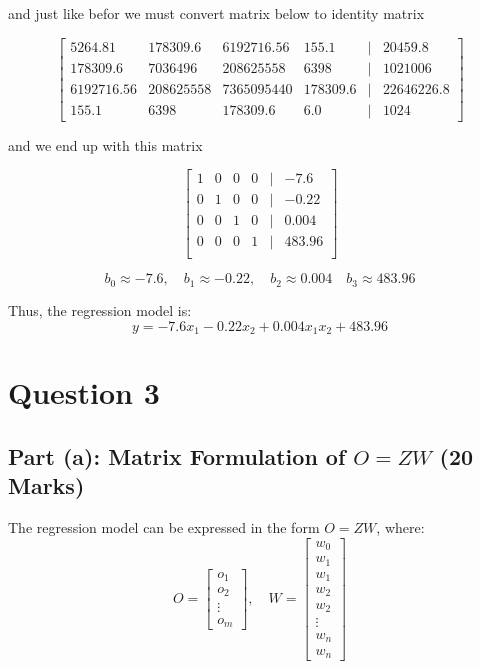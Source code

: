\documentclass{article}
\begin{document}
	and just like befor we must convert matrix below to identity matrix
	
	\[
	\begin{bmatrix}
		5264.81 & 178309.6 & 6192716.56 & 155.1 & \vert & 20459.8 \\
		178309.6 & 7036496 & 208625558 & 6398 & \vert & 1021006 \\
		6192716.56 & 208625558 & 7365095440 & 178309.6 & \vert & 22646226.8 \\
		155.1 & 6398 & 178309.6 & 6.0 & \vert & 1024
	\end{bmatrix}
	\]
	
	and we end up with this matrix
	
	\[
	\begin{bmatrix}
		1 & 0 & 0 & 0 & \vert & -7.6 \\
		0 & 1 & 0 & 0 & \vert & -0.22 \\
		0 & 0 & 1 & 0 & \vert & 0.004 \\
		0 & 0 & 0 & 1 & \vert & 483.96 \\
	\end{bmatrix}
	\]
	
	\[
	b_0 \approx -7.6, \quad b_1 \approx -0.22, \quad b_2 \approx 0.004 \quad b_3 \approx 483.96
	\]
	
	Thus, the regression model is:
	\[
	y = - 7.6 x_1 - 0.22 x_2 + 0.004 x_1 x_2 + 483.96
	\]
	
	\section*{Question 3}
	
	\subsection*{Part (a): Matrix Formulation of \( O = ZW \) (20 Marks)}
	
	The regression model can be expressed in the form \( O = ZW \), where:
	\[
	O = \begin{bmatrix} o_1 \\ o_2 \\ \vdots \\ o_m \end{bmatrix}, \quad 
	W = \begin{bmatrix} w_0 \\ w_1 \\ w_1 \\ w_2 \\ w_2 \\ \vdots \\ w_n \\ w_n \end{bmatrix}
	\]
	
\end{document}
